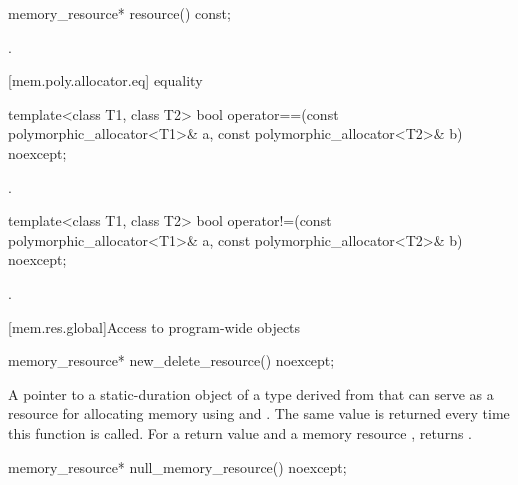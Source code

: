 %
\begin{itemdecl}
memory_resource* resource() const;
\end{itemdecl}

\begin{itemdescr}
\pnum
\returns
{}.
\end{itemdescr}

[mem.poly.allocator.eq]{ equality}

%
\begin{itemdecl}
template<class T1, class T2>
  bool operator==(const polymorphic_allocator<T1>& a,
                  const polymorphic_allocator<T2>& b) noexcept;
\end{itemdecl}

\begin{itemdescr}
\pnum
\returns
{}.
\end{itemdescr}

%
\begin{itemdecl}
template<class T1, class T2>
  bool operator!=(const polymorphic_allocator<T1>& a,
                  const polymorphic_allocator<T2>& b) noexcept;
\end{itemdecl}

\begin{itemdescr}
\pnum
\returns
{}.
\end{itemdescr}


[mem.res.global]{Access to program-wide  objects}

%
\begin{itemdecl}
memory_resource* new_delete_resource() noexcept;
\end{itemdecl}

\begin{itemdescr}
\pnum
\returns
A pointer to a static-duration object of a type derived from 
that can serve as a resource for allocating memory
using  and .
The same value is returned every time this function is called.
For a return value  and a memory resource ,
 returns .
\end{itemdescr}

%
\begin{itemdecl}
memory_resource* null_memory_resource() noexcept;
\end{itemdecl}

